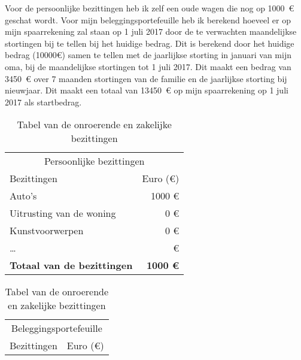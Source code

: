 Voor de persoonlijke bezittingen heb ik zelf een oude wagen die nog op 1000~\euro{} geschat wordt. Voor mijn beleggingsportefeuille heb ik berekend hoeveel er op mijn spaarrekening zal staan op 1 juli 2017 door de te verwachten maandelijkse stortingen bij te tellen bij het huidige bedrag. Dit is berekend door het huidige bedrag (10000\euro{}) samen te tellen met de jaarlijkse storting in januari van mijn oma, bij de maandelijkse stortingen tot 1 juli 2017. Dit maakt een bedrag van 3450~\euro{} over 7 maanden stortingen van de familie en de jaarlijkse storting bij nieuwjaar. Dit maakt een totaal van 13450~\euro{} op mijn spaarrekening op 1 juli 2017 als startbedrag.

\begin{table}[ht]
	\begin{minipage}[b]{9cm}\centering
		\begin{tabular}{@{}lr@{}}
			\toprule
			     \multicolumn{2}{c}{Persoonlijke bezittingen}       \\
			\cmidrule(r){1-2}
			Bezittingen   &     Euro (\euro{}) \\ \midrule
			Auto's                             &          1000 \euro{} \\
			Uitrusting van de woning           &          0 \euro{} \\
			Kunstvoorwerpen                    &          0 \euro{} \\
			\dots                              &            \euro{} \\ \toprule
			\textbf{Totaal van de bezittingen} & \textbf{1000 \euro{}} \\ \bottomrule
		\end{tabular}
		\caption{Tabel van de onroerende en zakelijke bezittingen}
		\label{tab:tabelonroerendeenzakelijkebezittingen}
		
		
	\end{minipage}
	\hspace{0.5cm}
	\begin{minipage}[b]{9cm}\centering
		\begin{tabular}{@{}lr@{}}
			\toprule
			       \multicolumn{2}{c}{Beleggingsportefeuille}        \\
			\cmidrule(r){1-2}
			Bezittingen   &      Euro (\euro{}) \\ \midrule
		

\end{tabular}
\end{minipage}
\end{table}
